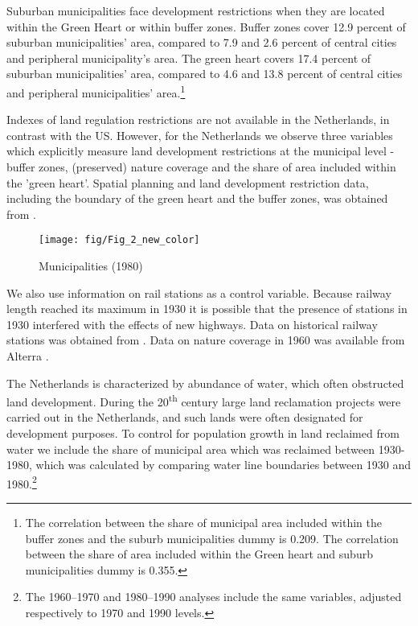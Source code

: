 \documentclass[a4paper,authoryear,review]{elsarticle}  	%
\begin{document}
	Suburban municipalities face development restrictions when they are located within the Green Heart or within buffer zones. Buffer zones cover 12.9 percent of suburban municipalities’ area, compared to 7.9 and 2.6 percent of central cities and peripheral municipality’s area. The green heart covers 17.4 percent of suburban municipalities’ area, compared to 4.6 and 13.8 percent of central cities and peripheral municipalities’ area.\footnote{The correlation between the share of municipal area included within the buffer zones and the suburb municipalities dummy is 0.209. The correlation between the share of area included within the Green heart and suburb municipalities dummy is 0.355.}

	Indexes of land regulation restrictions are not available in the Netherlands, in contrast with the US. However, for the Netherlands we observe three variables which explicitly measure land development restrictions at the municipal level - buffer zones, (preserved) nature coverage and the share of area included within the 'green heart'. Spatial planning and land development restriction data, including the boundary of the green heart and the buffer zones, was obtained from \citet{Koomen2008}. 
	
	
		
	\begin{figure}[!hbtp]
		\centering
		\caption{Municipalities (1980)}
		\texttt{[image: fig/Fig\_2\_new\_color]}\label{ch3.fig:2}
	\end{figure}
	
	We also use information on rail stations as a control variable. Because railway length reached its maximum in 1930 it is possible that the presence of stations in 1930 interfered with the effects of new highways. Data on historical railway stations was obtained from \citet{Koopmans2012}. Data on nature coverage in 1960 was available from Alterra \citep{Kramer2005}. 	

	The Netherlands is characterized by abundance of water, which often obstructed land development. During the 20\textsuperscript{th} century large land reclamation projects were carried out in the Netherlands, and such lands were often designated for development purposes. To control for population growth in land reclaimed from water we include the share of municipal area which was reclaimed between 1930-1980, which was calculated by comparing water line boundaries between 1930 and 1980.\footnote{The 1960--1970 and 1980--1990 analyses include the same variables, adjusted respectively to 1970 and 1990 levels.} 
	
\end{document}
